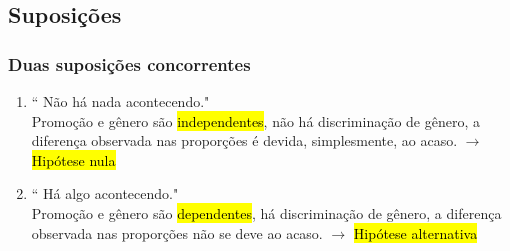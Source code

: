 
\subsection{Suposições}


\begin{frame}
\frametitle{Duas suposições concorrentes}

\begin{enumerate}
\justifying
\item `` Não há nada acontecendo." \\
\justifying
Promoção e gênero são \hl{independentes}, não há discriminação de gênero, a diferença observada nas proporções é devida, simplesmente,  ao acaso. $\rightarrow$ \hl{Hipótese nula}

\pause
\justifying
\item `` Há algo acontecendo." \\
\justifying
Promoção e gênero são \hl {dependentes}, há discriminação de gênero, a diferença observada nas proporções não se deve ao acaso. $\rightarrow$ \hl{Hipótese alternativa}

\end{enumerate}

\end{frame}


